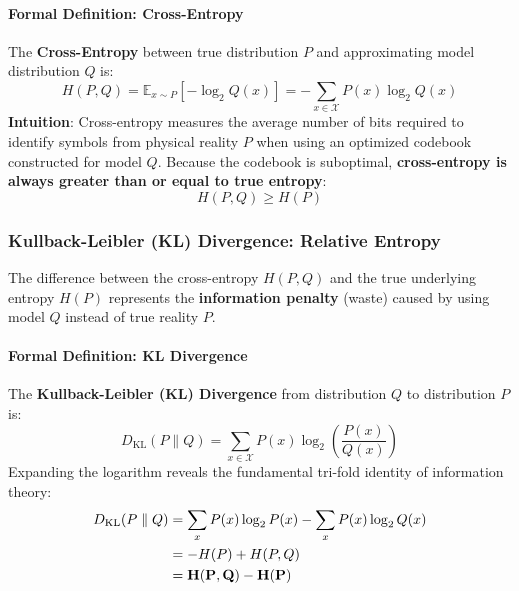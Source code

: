 \paragraph{Formal Definition: Cross-Entropy}
The \textbf{Cross-Entropy} between true distribution $P$ and approximating model distribution $Q$ is:
\begin{equation}
H(P, Q) = \mathbb{E}_{x \sim P}[-\log_2 Q(x)] = -\sum_{x \in \mathcal{X}} P(x) \log_2 Q(x)\label{eq:cross_entropy_def}
\end{equation}
\textbf{Intuition}: Cross-entropy measures the average number of bits required to identify symbols from physical reality $P$ when using an optimized codebook constructed for model $Q$. 
Because the codebook is suboptimal, \textbf{cross-entropy is always greater than or equal to true entropy}:
\begin{equation}
H(P, Q) \ge H(P)
\end{equation}

\subsubsection{Kullback-Leibler (KL) Divergence: Relative Entropy}
The difference between the cross-entropy $H(P, Q)$ and the true underlying entropy $H(P)$ represents the \textbf{information penalty} (waste) caused by using model $Q$ instead of true reality $P$.

\paragraph{Formal Definition: KL Divergence}
The \textbf{Kullback-Leibler (KL) Divergence} from distribution $Q$ to distribution $P$ is:
\begin{equation}
D_{\text{KL}}(P \parallel Q) = \sum_{x \in \mathcal{X}} P(x) \log_2 \left( \frac{P(x)}{Q(x)} \right)\label{eq:kl_divergence_def}
\end{equation}
Expanding the logarithm reveals the fundamental tri-fold identity of information theory:
\begin{align}
D_{\text{KL}}(P \parallel Q) &= \sum_{x} P(x) \log_2 P(x) - \sum_{x} P(x) \log_2 Q(x) \notag\\
&= -H(P) + H(P, Q) \notag\\
&= \mathbf{H(P, Q) - H(P)}\label{eq:kl_identity}
\end{align}

